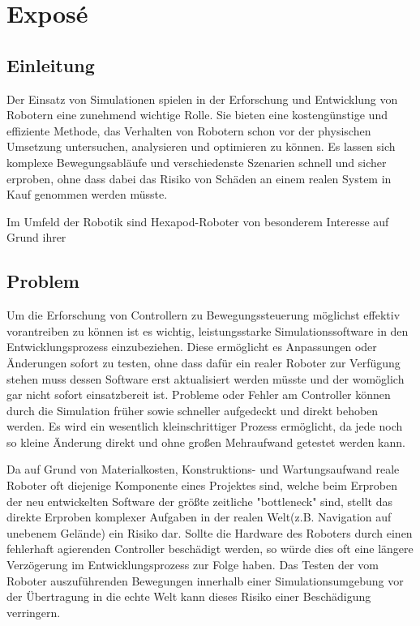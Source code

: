\chapter{Exposé}
\label{ch:expose}



\section{Einleitung}
Der Einsatz von Simulationen spielen in der Erforschung und Entwicklung von Robotern eine zunehmend wichtige Rolle. 
Sie bieten eine kostengünstige und effiziente Methode, das Verhalten von Robotern schon vor der physischen Umsetzung untersuchen, analysieren und optimieren zu können. 
Es lassen sich komplexe Bewegungsabläufe und verschiedenste Szenarien schnell und sicher erproben, ohne dass dabei das Risiko von Schäden an einem realen System in Kauf genommen werden müsste.

Im Umfeld der Robotik sind Hexapod-Roboter von besonderem Interesse auf Grund ihrer


\section{Problem}
Um die Erforschung von Controllern zu Bewegungssteuerung möglichst effektiv vorantreiben zu können ist es wichtig, leistungsstarke Simulationssoftware in den Entwicklungsprozess einzubeziehen.
Diese ermöglicht es Anpassungen oder Änderungen sofort zu testen, ohne dass dafür ein realer Roboter zur Verfügung stehen muss dessen Software erst aktualisiert werden müsste und der womöglich gar nicht sofort einsatzbereit ist.
Probleme oder Fehler am Controller können durch die Simulation früher sowie schneller aufgedeckt und direkt behoben werden.
Es wird ein wesentlich  kleinschrittiger Prozess ermöglicht, da jede noch so kleine Änderung direkt und ohne großen Mehraufwand getestet werden kann.

Da auf Grund von Materialkosten, Konstruktions- und Wartungsaufwand reale Roboter oft diejenige Komponente eines Projektes sind, welche beim Erproben der neu entwickelten Software der größte zeitliche "bottleneck" sind, stellt das direkte Erproben komplexer Aufgaben in der realen Welt(z.B. Navigation auf unebenem Gelände)  ein Risiko dar.
Sollte die Hardware des Roboters durch einen fehlerhaft agierenden Controller beschädigt werden, so würde dies oft eine längere Verzögerung im Entwicklungsprozess zur Folge haben.
Das Testen der vom Roboter auszuführenden Bewegungen innerhalb einer Simulationsumgebung vor der Übertragung in die echte Welt kann dieses Risiko einer Beschädigung verringern.

